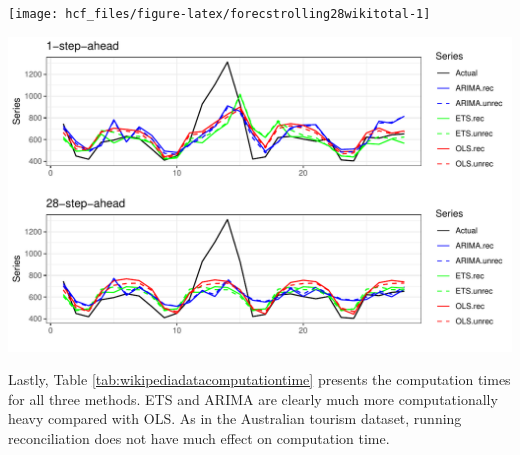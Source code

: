 \documentclass[11pt,a4paper,]{article}
\let\origfigure\figure
\let\endorigfigure\endfigure
\renewenvironment{figure}[1][2] {
    \expandafter\origfigure\expandafter[!htbp]
} {
    \endorigfigure
}
\begin{document}
\begin{figure}

{\centering \texttt{[image: hcf\_files/figure-latex/forecstrolling28wikitotal-1]} 

}

\caption{The actual test set for the 'Total' series compared to the forecasts from reconciled and unreconciled ETS, ARIMA and OLS methods for rolling and fixed origin 28-step-ahead Wikipedia pageviews.}\label{fig:forecstrolling28wikitotal}
\end{figure}

\begin{figure}

{\centering \includegraphics[width=1\linewidth]{hcf_files/figure-latex/forecstrolling28wiki-1} 

}

\caption{The actual test set for the 'desktopusenPho21' bottom level series compared to the forecasts from reconciled and unreconciled ETS, ARIMA and OLS methods for rolling and fixed origin 28-step-ahead Wikipedia pageviews.}\label{fig:forecstrolling28wiki}
\end{figure}

Lastly, Table \ref{tab:wikipediadatacomputationtime} presents the
computation times for all three methods. ETS and ARIMA are clearly much
more computationally heavy compared with OLS. As in the Australian
tourism dataset, running reconciliation does not have much effect on
computation time.
\end{document}
